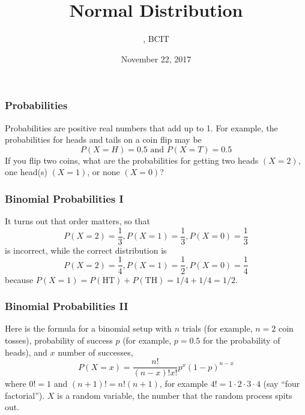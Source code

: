 \documentclass[xcolor=dvipsnames]{beamer}
\title{Normal Distribution}
\subtitle{{\CourseNumber}, BCIT}
\author{\CourseName}
\date{November 22, 2017}
\begin{document}
\begin{frame}
  \titlepage
\end{frame}

\begin{frame}
  \frametitle{Probabilities}
\alert{Probabilities} are positive real numbers that add up to 1. For example,
the probabilities for heads and tails on a coin flip may be
\begin{equation}
  \label{eq:veejooni}
  P(X=H)=0.5\mbox{ and }P(X=T)=0.5
\end{equation}
If you flip two coins, what are the probabilities for getting two
heads $(X=2)$, one head(s) $(X=1)$, or none $(X=0)$?
\end{frame}

\begin{frame}
  \frametitle{Binomial Probabilities I}
It turns out that order matters, so that
\begin{equation}
  \label{eq:eijietha}
  P(X=2)=\frac{1}{3},P(X=1)=\frac{1}{3},P(X=0)=\frac{1}{3}
\end{equation}
is incorrect, while the correct distribution is
\begin{equation}
  \label{eq:eepuneeb}
  P(X=2)=\frac{1}{4},P(X=1)=\frac{1}{2},P(X=0)=\frac{1}{4}
\end{equation}
because $P(X=1)=P(\mbox{HT})+P(\mbox{TH})=1/4+1/4=1/2$.
\end{frame}

\begin{frame}
  \frametitle{Binomial Probabilities II}
Here is the formula for a \alert{binomial} setup with $n$ trials (for example,
$n=2$ coin tosses), probability of success $p$ (for example, $p=0.5$ for the
probability of heads), and $x$ number of successes,
\begin{equation}
  \label{eq:iedohdah}
  P(X=x)=\frac{n!}{(n-x)!x!}p^{x}(1-p)^{n-x}
\end{equation}
where $0!=1$ and $(n+1)!=n!(n+1)$, for example
$4!=1\cdot{}2\cdot{}3\cdot{}4$ (say ``four factorial''). $X$ is a
\alert{random variable}, the number that the random process spits out.
\end{frame}
\end{document}
